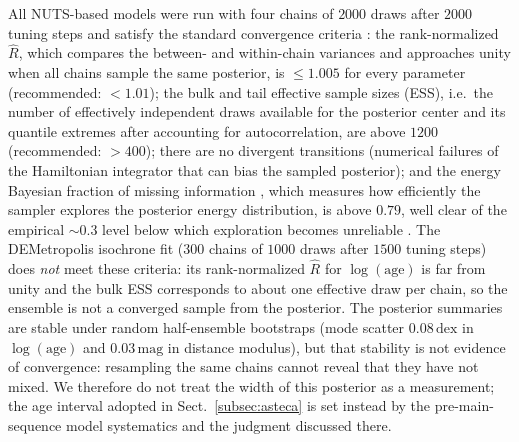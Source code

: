 \documentclass{aa}
\begin{document}
All NUTS-based models were run with four chains of $2000$ draws after $2000$ tuning steps and satisfy the standard convergence criteria \citep{2021BayAn..16..667V}: the rank-normalized $\hat{R}$, which compares the between- and within-chain variances and approaches unity when all chains sample the same posterior, is $\leq1.005$ for every parameter (recommended: $<1.01$); the bulk and tail effective sample sizes (ESS), i.e.\ the number of effectively independent draws available for the posterior center and its quantile extremes after accounting for autocorrelation, are above $1200$ (recommended: $>400$); there are no divergent transitions (numerical failures of the Hamiltonian integrator that can bias the sampled posterior); and the energy Bayesian fraction of missing information \citep[E-BFMI;][]{2016arXiv160400695B}, which measures how efficiently the sampler explores the posterior energy distribution, is above $0.79$, well clear of the empirical ${\sim}0.3$ level below which exploration becomes unreliable \citep{2017arXiv170102434B}. The DEMetropolis isochrone fit ($300$ chains of $1000$ draws after $1500$ tuning steps) does \emph{not} meet these criteria: its rank-normalized $\hat{R}$ for $\log(\mathrm{age})$ is far from unity and the bulk ESS corresponds to about one effective draw per chain, so the ensemble is not a converged sample from the posterior. The posterior summaries are stable under random half-ensemble bootstraps (mode scatter $0.08\,\mathrm{dex}$ in $\log(\mathrm{age})$ and $0.03\,\mathrm{mag}$ in distance modulus), but that stability is not evidence of convergence: resampling the same chains cannot reveal that they have not mixed. We therefore do not treat the width of this posterior as a measurement; the age interval adopted in Sect.~\ref{subsec:asteca} is set instead by the pre-main-sequence model systematics and the judgment discussed there.
\end{document}
